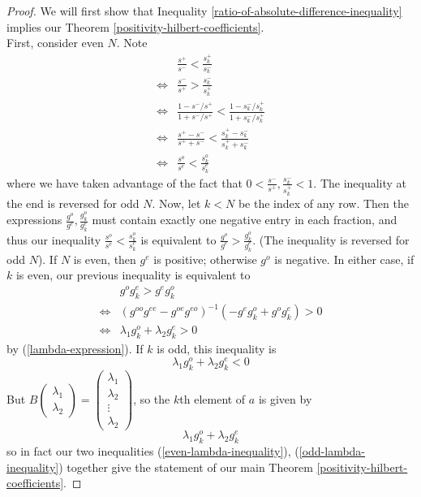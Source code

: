 \documentclass{article}
\theoremstyle{definition}
\theoremstyle{remark}
\numberwithin{equation}{section}
\begin{document}
\begin{proof}
We will first show that Inequality \ref{ratio-of-absolute-difference-inequality} implies our Theorem \ref{positivity-hilbert-coefficients}.\\
First, consider even $N$. Note 
\begin{align*}
& \frac{s^+}{s^-} < \frac{s_k^+}{s_k^-}\\
\iff & \frac{s^-}{s^+} > \frac{s^-_k}{s^+_k}\\
\iff& \frac{1-s^-/s^+}{1+s^-/s^+} < \frac{1-s^-_k /s^+_k}{1+s^-_k/s^+_k} \\
\iff & \frac{s^+ - s^-}{s^+ +s^-} <\frac{s^+_k - s^-_k}{s^+_k +s^-_k} \\
\iff&\frac{s^o}{s^e} < \frac{s^o_k}{s^e_k} 
\end{align*} where we have taken advantage of the fact that $0<\frac{s^-}{s^+}, \frac{s^-_k}{s^+_k}<1$. The inequality at the end is reversed for odd $N$. Now, let $k <N$ be the index of any row. Then the expressions $\frac{g^o}{g^e}, \frac{g^o_k}{g^e_k}$ must contain exactly one negative entry in each fraction, and thus our inequality $\frac{s^o}{s^e} < \frac{s^o_k}{s^e_k}$ is equivalent to $\frac{g^o}{g^e} > \frac{g^o_k}{g^e_k}$. (The inequality is reversed for odd $N$). If $N$ is even, then $g^e$ is positive; otherwise $g^o$ is negative. In either case, if $k$ is even, our previous inequality is equivalent to 
\begin{align}
&g^og^e_k > g^eg^o_k \\
\iff & (g^{oo}g^{ee} - g^{oe}g^{eo})^{-1}(-g^eg^o_k+g^og^e_k)>0 \\
\iff& \lambda_1 g^o_k + \lambda_2 g^e_k >0 \label{even-lambda-inequality}
\end{align}
by (\ref{lambda-expression}). If $k$ is odd, this inequality is 
\begin{equation}\label{odd-lambda-inequality} \lambda_1 g^o_k + \lambda_2 g^e_k <0 \end{equation}
But $B \begin{pmatrix} \lambda_1 \\ \lambda_2 \end{pmatrix} = \begin{pmatrix} \lambda_1 \\ \lambda_2 \\ \vdots \\ \lambda_2 \end{pmatrix}$, so the $k$th element of $a$ is given by 
\begin{equation}\label{ratio-linear-combination} \lambda_1 g_k^o + \lambda_2 g_k^e \end{equation} so in fact our two inequalities (\ref{even-lambda-inequality}), (\ref{odd-lambda-inequality}) together give the statement of our main Theorem \ref{positivity-hilbert-coefficients}.


\end{proof}
\end{document}
